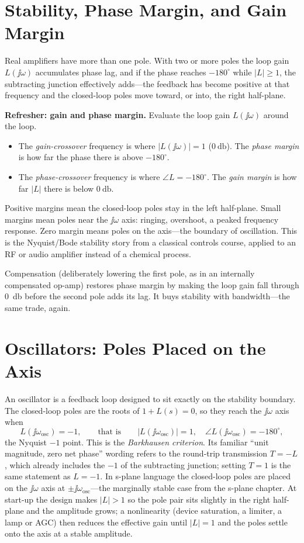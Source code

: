 \section{Stability, Phase Margin, and Gain Margin}
Real amplifiers have more than one pole. With two or more poles the loop gain
\(L(\jj\omega)\) accumulates phase lag, and if the phase reaches \(-180^\circ\)
while \(|L|\ge 1\), the subtracting junction effectively adds---the feedback has
become positive at that frequency and the closed-loop poles move toward, or
into, the right half-plane.

\begin{controlsbox}
\textbf{Refresher: gain and phase margin.} Evaluate the loop gain
\(L(\jj\omega)\) around the loop.
\begin{itemize}
\item The \emph{gain-crossover} frequency is where \(|L(\jj\omega)|=1\)
(\(\SI{0}{\decibel}\)). The \emph{phase margin} is how far the phase there is
above \(-180^\circ\).
\item The \emph{phase-crossover} frequency is where \(\angle L=-180^\circ\). The
\emph{gain margin} is how far \(|L|\) there is below \(\SI{0}{\decibel}\).
\end{itemize}
Positive margins mean the closed-loop poles stay in the left half-plane. Small
margins mean poles near the \(\jj\omega\) axis: ringing, overshoot, a peaked
frequency response. Zero margin means poles on the axis---the boundary of
oscillation. This is the Nyquist/Bode stability story from a classical controls
course, applied to an RF or audio amplifier instead of a chemical process.
\end{controlsbox}

Compensation (deliberately lowering the first pole, as in an internally
compensated op-amp) restores phase margin by making the loop gain fall through
\SI{0}{\decibel} before the second pole adds its lag. It buys stability with
bandwidth---the same trade, again.

\section{Oscillators: Poles Placed on the Axis}
An oscillator is a feedback loop designed to sit exactly on the stability
boundary. The closed-loop poles are the roots of \(1+L(s)=0\), so they reach the
\(\jj\omega\) axis when
\[
L(\jj\omega_{\text{osc}})=-1,
\qquad\text{that is}\qquad
|L(\jj\omega_{\text{osc}})|=1,\quad
\angle L(\jj\omega_{\text{osc}})=-180^\circ,
\]
the Nyquist \(-1\) point. This is the \emph{Barkhausen criterion}. Its familiar
``unit magnitude, zero net phase'' wording refers to the round-trip transmission
\(T=-L\), which already includes the \(-1\) of the subtracting junction; setting
\(T=1\) is the same statement as \(L=-1\). In s-plane language the closed-loop
poles are placed on the \(\jj\omega\) axis at \(\pm\jj\omega_{\text{osc}}\)---the
marginally stable case from the s-plane chapter. At start-up the design makes \(|L|>1\) so the pole pair sits slightly in
the right half-plane and the amplitude grows; a nonlinearity (device saturation,
a limiter, a lamp or AGC) then reduces the effective gain until \(|L|=1\) and the
poles settle onto the axis at a stable amplitude.

